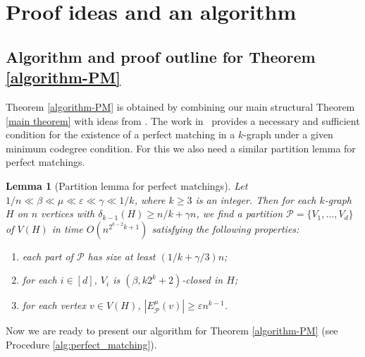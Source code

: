 \documentclass[11pt, letterpaper]{amsart}
\theoremstyle{plain}
\numberwithin{equation}{section}
\newtheorem{lemma}[thm]{Lemma}
\theoremstyle{definition}
\newcommand\card[1]{\left| #1 \right|}
\begin{document}
\section{Proof ideas and an algorithm}


\subsection{Algorithm and proof outline for Theorem \ref{algorithm-PM}}
Theorem \ref{algorithm-PM} is obtained by combining our main structural Theorem \ref{main theorem} with ideas from \cite{han2017decision}. 
The work in~\cite{han2017decision} provides a necessary and sufficient condition for the existence of a perfect matching in a $k$-graph under a given minimum codegree condition. 
For this we also need a similar partition lemma for perfect matchings.
	
    \begin{lemma}
    [Partition lemma for perfect matchings]
    \label{better partition of PM}
		Let $ 1/n\ll \beta\ll\mu\ll\varepsilon\ll\gamma\ll1/k $, where $ k\ge 3 $ is an integer. 
        Then for each $k$-graph $ H $ on $ n $ vertices with $ \delta_{k-1}(H)\ge n/k+\gamma n $, we find a partition $\mathcal{P}=\{V_1,\dots,V_d\}$ of $ V(H) $ in time $O(n^{2^{k-2}k+1})$ satisfying the following properties:
		
        \begin{enumerate}[label=(P\arabic*)]
            \item each part of $ \mathcal{P} $ has size at least $ (1/k+\gamma/3)n $;\label{item:P1}
            \item for each $ i\in[d] $, $ V_i $ is $ (\beta,k2^k+2) $-closed in $ H $;\label{item:P3}
            \item for each vertex $ v\in V(H) $, $ \card{E^{\mu}_{\mathcal{P}}(v)}\ge \varepsilon n^{k-1} $.\label{item:P2}
        \end{enumerate}	
    \end{lemma}

    Now we are ready to present our algorithm for Theorem \ref{algorithm-PM} (see Procedure \ref{alg:perfect_matching}).
\end{document}
